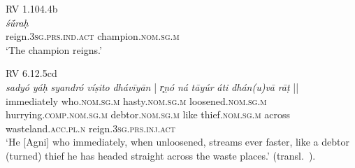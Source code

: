 \documentclass[output=paper,colorlinks,citecolor=brown]{langscibook}
\begin{document}
\begin{exe}
\ex RV 1.104.4b\\  \gll
{} \textit{śū́raḥ}\\
reign.\textsc{3sg.prs.ind.act} champion.\textsc{nom.sg.m}\\
\glt `The champion reigns.' 
\end{exe}

\begin{exe}
    \ex  RV 6.12.5cd\\ \gll 
\textit{sadyó} \textit{yáḥ} \textit{syandró} \textit{víṣito} {\textit{dhávīyān}  |}
\textit{r̥ṇó} \textit{ná} \textit{tāyúr} \textit{áti} \textit{dhán(u)vā} {\textit{rāṭ} ||}\\
{immediately} who.\textsc{nom.sg.m} {hasty}.\textsc{nom.sg.m} loosened.\textsc{nom.sg.m} hurrying.\textsc{comp.nom.sg.m}  {debtor}.\textsc{nom.sg.m} like thief.\textsc{nom.sg.m} across wasteland.\textsc{acc.pl.n} reign.\textsc{3sg.prs.inj.act} \\
\glt `He [Agni] who immediately, when unloosened, streams ever faster, like a debtor (turned) thief he has headed straight across the waste places.' (transl.\ \citealt[786]{JamisonBrereton2014}). 
\end{exe}
\end{document}
